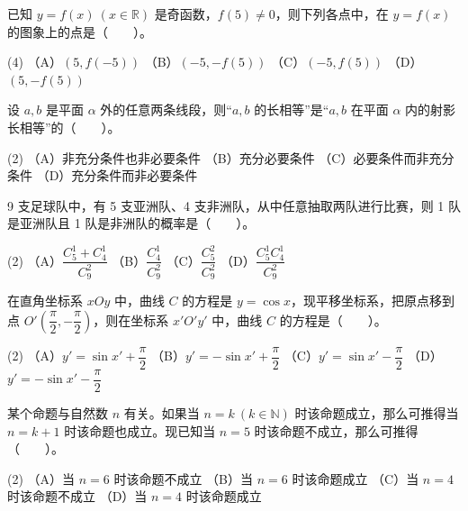 \begin{question}
已知 $y=f(x)\ (x\in\mathbb R)$ 是奇函数，$f(5)\ne0$，则下列各点中，在 $y=f(x)$ 的图象上的点是\mbox{（　　）}。

\begin{gkopts}(4)
\task （A）$(5,f(-5))$
\task （B）$(-5,-f(5))$
\task （C）$(-5,f(5))$
\task （D）$(5,-f(5))$
\end{gkopts}

\end{question}
\begin{question}
设 $a,b$ 是平面 $\alpha$ 外的任意两条线段，则“$a,b$ 的长相等”是“$a,b$ 在平面 $\alpha$ 内的射影长相等”的\mbox{（　　）}。

\begin{gkopts}(2)
\task （A）非充分条件也非必要条件
\task （B）充分必要条件
\task （C）必要条件而非充分条件
\task （D）充分条件而非必要条件
\end{gkopts}

\end{question}
\begin{question}
9 支足球队中，有 5 支亚洲队、4 支非洲队，从中任意抽取两队进行比赛，则 1 队是亚洲队且 1 队是非洲队的概率是\mbox{（　　）}。

\begin{gkopts}(2)
\task （A）$\dfrac{C_5^1+C_4^1}{C_9^2}$
\task （B）$\dfrac{C_4^1}{C_9^2}$
\task （C）$\dfrac{C_5^2}{C_9^2}$
\task （D）$\dfrac{C_5^1C_4^1}{C_9^2}$
\end{gkopts}

\end{question}
\begin{question}
在直角坐标系 $xOy$ 中，曲线 $C$ 的方程是 $y=\cos x$，现平移坐标系，把原点移到点 $O'\left(\dfrac\pi2,-\dfrac\pi2\right)$，则在坐标系 $x'O'y'$ 中，曲线 $C$ 的方程是\mbox{（　　）}。

\begin{gkopts}(2)
\task （A）$y'=\sin x'+\dfrac\pi2$
\task （B）$y'=-\sin x'+\dfrac\pi2$
\task （C）$y'=\sin x'-\dfrac\pi2$
\task （D）$y'=-\sin x'-\dfrac\pi2$
\end{gkopts}

\end{question}
\begin{question}
某个命题与自然数 $n$ 有关。如果当 $n=k\ (k\in\mathbb N)$ 时该命题成立，那么可推得当 $n=k+1$ 时该命题也成立。现已知当 $n=5$ 时该命题不成立，那么可推得\mbox{（　　）}。

\begin{gkopts}(2)
\task （A）当 $n=6$ 时该命题不成立
\task （B）当 $n=6$ 时该命题成立
\task （C）当 $n=4$ 时该命题不成立
\task （D）当 $n=4$ 时该命题成立
\end{gkopts}

\end{question}

